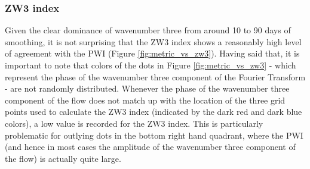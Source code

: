 \subsubsection{ZW3 index}

Given the clear dominance of wavenumber three from around 10 to 90 days of smoothing, it is not surprising that the ZW3 index \citep{Raphael2004} shows a reasonably high level of agreement with the PWI (Figure \ref{fig:metric_vs_zw3}). Having said that, it is important to note that colors of the dots in Figure \ref{fig:metric_vs_zw3} - which represent the phase of the wavenumber three component of the Fourier Transform - are not randomly distributed. Whenever the phase of the wavenumber three component of the flow does not match up with the location of the three grid points used to calculate the ZW3 index (indicated by the dark red and dark blue colors), a low value is recorded for the ZW3 index. This is particularly problematic for outlying dots in the bottom right hand quadrant, where the PWI (and hence in most cases the amplitude of the wavenumber three component of the flow) is actually quite large.      